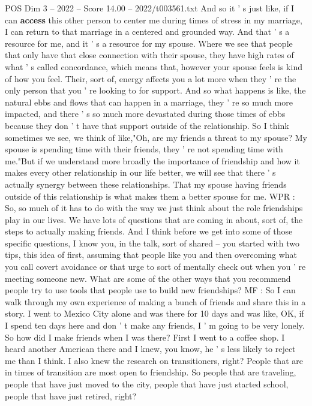 \begin{textsample}{POS Dim 3 – 2022 – Score 14.00 – 2022/t003561.txt}
And so it ' s just like, if I can \textbf{access} this other person to center me during times of stress in my marriage, I can return to that marriage in a centered and grounded way.
And that ' s a resource for me, and it ' s a resource for my spouse.
Where we see that people that only have that close connection with their spouse, they have high rates of what ' s called concordance, which means that, however your spouse feels is kind of how you feel.
Their, sort of, energy affects you a lot more when they ' re the only person that you ' re looking to for support.
And so what happens is like, the natural ebbs and flows that can happen in a marriage, they ' re so much more impacted, and there ' s so much more devastated during those times of ebbs because they don ' t have that support outside of the relationship.
So I think sometimes we see, we think of like,"Oh, are my friends a threat to my spouse?
My spouse is spending time with their friends, they ' re not spending time with me."But if we understand more broadly the importance of friendship and how it makes every other relationship in our life better, we will see that there ' s actually synergy between these relationships.
That my spouse having friends outside of this relationship is what makes them a better spouse for me.
WPR : So, so much of it has to do with the way we just think about the role friendships play in our lives.
We have lots of questions that are coming in about, sort of, the steps to actually making friends.
And I think before we get into some of those specific questions, I know you, in the talk, sort of shared -- you started with two tips, this idea of first, assuming that people like you and then overcoming what you call covert avoidance or that urge to sort of mentally check out when you ' re meeting someone new.
What are some of the other ways that you recommend people try to use tools that people use to build new friendships?
MF : So I can walk through my own experience of making a bunch of friends and share this in a story.
I went to Mexico City alone and was there for 10 days and was like, OK, if I spend ten days here and don ' t make any friends, I ' m going to be very lonely.
So how did I make friends when I was there?
First I went to a coffee shop.
I heard another American there and I knew, you know, he ' s less likely to reject me than I think.
I also knew the research on transitioners, right?
People that are in times of transition are most open to friendship.
So people that are traveling, people that have just moved to the city, people that have just started school, people that have just retired, right?

\end{textsample}
